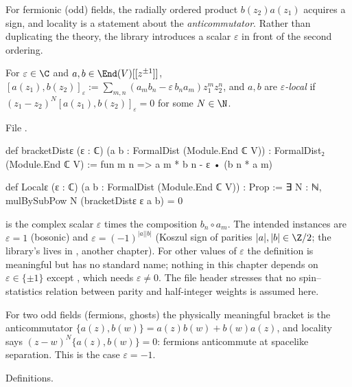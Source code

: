 For fermionic (odd) fields, the radially ordered product $b(z_2)a(z_1)$ acquires a sign, and locality is a
statement about the \emph{anticommutator}. Rather than duplicating the theory, the library introduces a
scalar $\varepsilon$ in front of the second ordering.

\begin{definition}\label{l01:def:bracketeps}
For $\varepsilon\in\C$ and $a,b\in\End(\loneV)[[z^{\pm1}]]$,
$[a(z_1),b(z_2)]_\varepsilon := \sum_{m,n}(a_mb_n-\varepsilon\,b_na_m)z_1^mz_2^n$, and $a,b$ are
\emph{$\varepsilon$-local} if $(z_1-z_2)^N[a(z_1),b(z_2)]_\varepsilon = 0$ for some $N\in\N$.
\end{definition}

\noindent File .
\begin{leancode}
def bracketDistε (ε : ℂ) (a b : FormalDist (Module.End ℂ V)) : FormalDist₂ (Module.End ℂ V) :=
  fun m n => a m * b n - ε • (b n * a m)

def Localε (ε : ℂ) (a b : FormalDist (Module.End ℂ V)) : Prop :=
  ∃ N : ℕ, mulBySubPow N (bracketDistε ε a b) = 0
\end{leancode}

\begin{dictionary}
 is the complex scalar $\varepsilon$ times the composition $b_n\circ a_m$. The intended
instances are $\varepsilon = 1$ (bosonic) and $\varepsilon = (-1)^{|a||b|}$ (Koszul sign of parities $|a|,|b|\in\Z/2$;
the library's  lives in , another chapter).
For other values of $\varepsilon$ the definition is meaningful but has no standard name; nothing in this chapter
depends on $\varepsilon\in\{\pm1\}$ except , which needs $\varepsilon\neq0$. The file header
stresses that no spin--statistics relation between parity and half-integer weights is assumed here.
\end{dictionary}

\begin{physics}
For two odd fields (fermions, ghosts) the physically meaningful bracket is the anticommutator
$\{a(z),b(w)\} = a(z)b(w)+b(w)a(z)$, and locality says $(z-w)^N\{a(z),b(w)\} = 0$: fermions anticommute at
spacelike separation. This is the case $\varepsilon = -1$.
\end{physics}

\begin{status}
Definitions.
\end{status}

